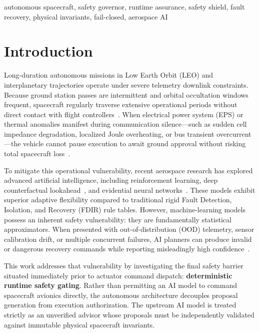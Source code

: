 \documentclass[conference]{IEEEtran}
\begin{document}
\begin{IEEEkeywords}
\setlength{\parindent}{0pt}
autonomous spacecraft, safety governor, runtime assurance, safety shield, fault recovery, physical invariants, fail-closed, aerospace AI
\end{IEEEkeywords}

\section{Introduction}

Long-duration autonomous missions in Low Earth Orbit (LEO) and interplanetary trajectories operate under severe telemetry downlink constraints. Because ground station passes are intermittent and orbital occultation windows frequent, spacecraft regularly traverse extensive operational periods without direct contact with flight controllers~\cite{chien2005autonomous}. When electrical power system (EPS) or thermal anomalies manifest during communication silence—such as sudden cell impedance degradation, localized Joule overheating, or bus transient overcurrent—the vehicle cannot pause execution to await ground approval without risking total spacecraft loss~\cite{muscettola1998remote}.

To mitigate this operational vulnerability, recent aerospace research has explored advanced artificial intelligence, including reinforcement learning, deep counterfactual lookahead~\cite{thambisetty2026astraheal}, and evidential neural networks~\cite{astraheal2026paper2}. These models exhibit superior adaptive flexibility compared to traditional rigid Fault Detection, Isolation, and Recovery (FDIR) rule tables. However, machine-learning models possess an inherent safety vulnerability: they are fundamentally statistical approximators. When presented with out-of-distribution (OOD) telemetry, sensor calibration drift, or multiple concurrent failures, AI planners can produce invalid or dangerous recovery commands while reporting misleadingly high confidence~\cite{guo2017calibration}.

This work addresses that vulnerability by investigating the final safety barrier situated immediately prior to actuator command dispatch: \textbf{deterministic runtime safety gating}. Rather than permitting an AI model to command spacecraft avionics directly, the autonomous architecture decouples proposal generation from execution authorization. The upstream AI model is treated strictly as an unverified advisor whose proposals must be independently validated against immutable physical spacecraft invariants.
\end{document}
